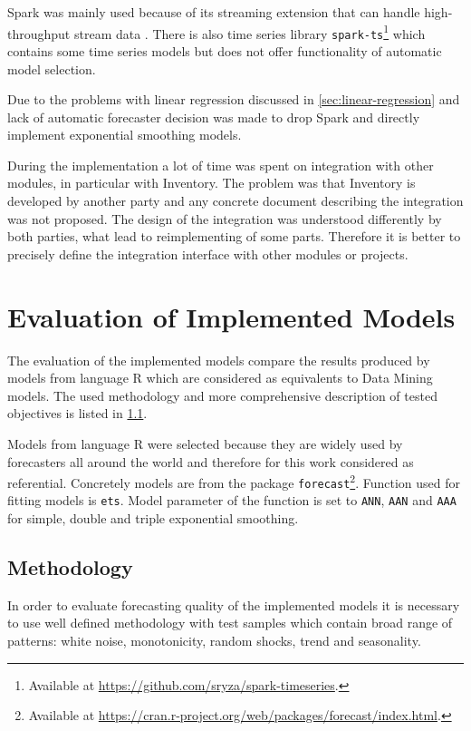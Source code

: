    Spark was mainly used because of its streaming extension that can handle
    high-throughput stream data \cite{apache-spark}. There is also time series library
    \texttt{spark-ts}\footnote{Available at \url{https://github.com/sryza/spark-timeseries}.} which contains some
    time series models but does not offer functionality of automatic model selection.

    Due to the problems with linear regression discussed in \ref{sec:linear-regression} and lack of automatic
    forecaster decision was made to drop Spark and directly implement exponential smoothing models.

    During the implementation a lot of time was spent on integration with other modules, in particular with Inventory.
    The problem was that Inventory is developed by another party and any concrete document
    describing the integration was not proposed. The design of the integration was understood differently
    by both parties, what lead to reimplementing of some parts. Therefore it is better to precisely define the
    integration interface with other modules or projects.

\chapter{Evaluation of Implemented Models} \label{chap:evaluation}
The evaluation of the implemented models compare the results produced by models from language R which are
considered as equivalents to Data Mining models. The used methodology and more comprehensive description of tested
objectives is listed in \ref{sec:methodology}.

Models from language R were selected because they are widely used by forecasters all around the world and therefore
for this work considered as referential. Concretely models are from the package
\texttt{forecast}\footnote{Available at \url{https://cran.r-project.org/web/packages/forecast/index.html}.}.
Function used for fitting models is \texttt{ets}. Model parameter of the function is set to \texttt{ANN}, \texttt{AAN}
and \texttt{AAA} for simple, double and triple exponential smoothing.

    \section{Methodology} \label{sec:methodology}
    In order to evaluate forecasting quality of the implemented models it is necessary to use well defined
    methodology with test samples which contain broad range of patterns: white noise, monotonicity, random shocks,
    trend and seasonality.

